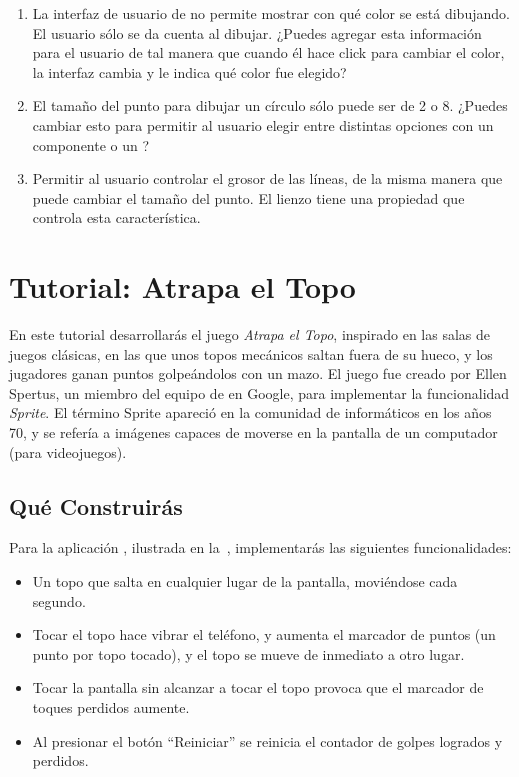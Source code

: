 \begin{enumerate}

\item La interfaz de usuario de  no permite mostrar
  con qué color se está dibujando. El usuario sólo se da cuenta al
  dibujar. ¿Puedes agregar esta información para el usuario de tal
  manera que cuando él hace click para cambiar el color, la interfaz
  cambia y le indica qué color fue elegido?

\item El tamaño del punto para dibujar un círculo sólo puede ser de 2
  o 8.  ¿Puedes cambiar esto para permitir al usuario elegir entre
  distintas opciones con un componente  o un
  ?

\item Permitir al usuario controlar el grosor de las líneas, de la
  misma manera que puede cambiar el tamaño del punto. El lienzo tiene
  una propiedad  que controla esta
  característica.
\end{enumerate}

\section{Tutorial: Atrapa el Topo}

En este tutorial desarrollarás el juego \emph{Atrapa el Topo},
inspirado en las salas de juegos clásicas, en las que unos topos
mecánicos saltan fuera de su hueco, y los jugadores ganan puntos
golpeándolos con un mazo. El juego fue creado por Ellen Spertus, un
miembro del equipo de \AppInventor en Google, para implementar la
funcionalidad \emph{Sprite}. El término Sprite apareció en la
comunidad de informáticos en los años 70, y se refería a imágenes
capaces de moverse en la pantalla de un computador (para videojuegos).

\subsection*{Qué Construirás}

Para la aplicación , ilustrada en
la~, implementarás las siguientes funcionalidades:

\begin{itemize}

\item Un topo que salta en cualquier lugar de la pantalla, moviéndose
  cada segundo.

\item Tocar el topo hace vibrar el teléfono, y aumenta el marcador de
  puntos (un punto por topo tocado), y el topo se mueve de inmediato a
  otro lugar.

\item Tocar la pantalla sin alcanzar a tocar el topo provoca que el
  marcador de toques perdidos aumente.

\item Al presionar el botón ``Reiniciar'' se reinicia el contador de
  golpes logrados y perdidos.

\end{itemize}

